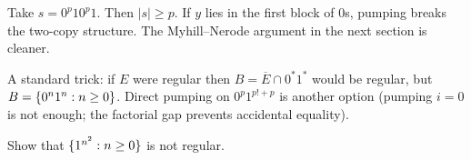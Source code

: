 \begin{example}[$F=\set{ww:w\in\set{0,1}^*}$]
Take $s=0^p10^p1$. Then $|s|\geq p$. If $y$ lies in the first block of $0$s,
pumping breaks the two-copy structure. The Myhill--Nerode argument in the
next section is cleaner.
\end{example}

\begin{example}[$E=\set{0^i1^j:i\neq j}$]
A standard trick: if $E$ were regular then
$B=\overline{E}\cap 0^*1^*$ would be regular, but $B=\{0^n1^n:n\geq 0\}$.
Direct pumping on $0^{p}1^{p!+p}$ is another option (pumping $i=0$ is not
enough; the factorial gap prevents accidental equality).
\end{example}

\begin{exercise}
Show that $\{1^{n^2}:n\geq 0\}$ is not regular.
\end{exercise}
